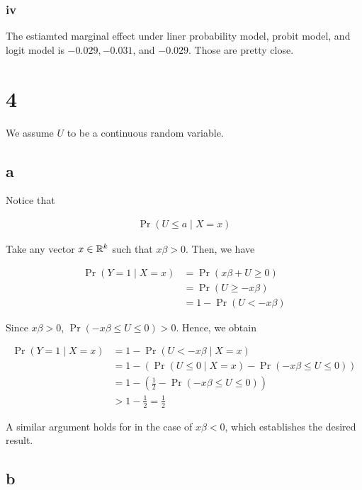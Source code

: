 \documentclass[11pt]{article}
\begin{document}
\subsubsection*{iv}

The estiamted marginal effect under liner probability model, probit model, and logit model is $-0.029, -0.031$, and $-0.029$. Those are pretty close.

\section*{4}

We assume $U$ to be a continuous random variable.

\subsection*{a}\label{q:4_a}

Notice that

\begin{align*}
    \Pr(U \leq a \mid X = x)
\end{align*}

Take any vector $x\in \mathbb{R}^k$ such that $x\beta > 0$. Then, we have

\begin{align*}
    \Pr(Y = 1 \mid X = x)
    &= \Pr(x\beta + U \geq 0) \\
    &= \Pr(U \geq - x\beta) \\
    &= 1 - \Pr(U < - x\beta)
\end{align*}

Since $x\beta > 0$, $\Pr(- x\beta \leq U \leq 0) > 0$. Hence, we obtain

\begin{align*}
    \Pr(Y = 1 \mid X = x)
    &= 1 - \Pr(U < - x\beta \mid X = x) \\
    &= 1 - \left( \Pr(U \leq 0 \mid X = x) - \Pr(- x\beta \leq U \leq 0) \right) \\
    &= 1 - \left( \frac{1}{2} - \Pr(- x\beta \leq U \leq 0) \right) \\
    &> 1 - \frac{1}{2} = \frac{1}{2}
\end{align*}

A similar argument holds for in the case of $x\beta < 0$, which establishes the desired result.

\subsection*{b}\label{q:4_b}
\end{document}
